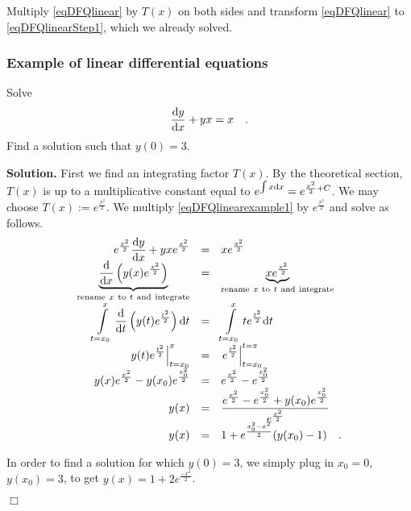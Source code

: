 \documentclass[12pt]{book}
\newenvironment{solution}{\medskip\noindent\textbf{Solution.} }{$\Box$}
\renewcommand{\optionalDisplay}[1]{}
\begin{document}
Multiply \eqref{eqDFQlinear} by $T(x)$ on both sides and transform \eqref{eqDFQlinear} to \eqref{eqDFQlinearStep1}, which we already solved.
\subsubsection{Example of linear differential equations}
Solve
\begin{equation}\label{eqDFQlinearexample1}
\frac{{\normalfont \text{d}} y}{{\normalfont \text{d}} x}+ y x=x\quad .
\end{equation} Find a solution such that $y(0)=3$.

\begin{solution}
First we find an integrating factor $T(x)$. By the theoretical section, $T(x)$ is up to a multiplicative constant equal to $e^{\int x {\normalfont \text{d}} x}= e^{\frac{x^2}2 +C}$. We may choose $T(x):= e^{\frac{x^2}2}$. We multiply \eqref{eqDFQlinearexample1} by $e^{\frac{x^2}2}$ and solve as follows.
\[
\begin{array}{rcl}
\displaystyle e^{\frac{x^2}2}\frac{{\normalfont \text{d}} y}{{\normalfont \text{d}} x}+ yxe^{\frac{x^2}2}&=&\displaystyle xe^{\frac{x^2}2}\\
\underbrace{\frac{{\normalfont \text{d}}}{{\normalfont \text{d}} x} \left(y(x) e^{\frac{x^2}2} \right)}_{\mathrm{rename~}x~\mathrm{to~}t\mathrm{~and~integrate}}&=&\underbrace{xe^{\frac{x^2}2}}_{\mathrm{rename~}x\mathrm{~to~}t\mathrm{~and~integrate}}\\
\displaystyle\int\limits_{t=x_0}^x \frac{{\normalfont \text{d}}}{{\normalfont \text{d}} t} \left(y(t) e^{\frac{t^2}2}\right) {\normalfont \text{d}} t &=&\displaystyle \int\limits_{t=x_0}^x  te^{\frac{t^2}2}{\normalfont \text{d}} t\\
\displaystyle\left.y(t) e^{\frac{t^2}2}\right|_{t=x_0}^x&=&\displaystyle \left.e^{\frac{t^2}2}\right|_{t=x_0}^{t=x}\\
\displaystyle y(x)e^{\frac{x^2}2}- y(x_0)e^{\frac{x_0^2}2}&=&\displaystyle e^{\frac{x^2}2}- e^{\frac{x_0^2}2}\\
y(x)&=&\displaystyle \frac{e^{\frac{x^2}2}- e^{\frac{x_0^2}2}+ y(x_0)e^{\frac{x_0^2}2}}{e^{\frac{x^2}2}}\\
y(x)&=&\displaystyle 1+{e^{\frac{x_0^2-x^2}2}}(y(x_0)-1)\quad.
\end{array}
\]

In order to find a solution for which $y(0)=3$, we simply plug in $x_0=0$, $y(x_0)=3$, to get $y(x)=1+2e^{\frac{-x^2}2}$.

\optionalDisplay{
\begin{pspicture}(-5,-5)(5,5)
\psaxes{<->}(0,0)(-5,-5)(5,5)
\newcommand{\Xstart}{1}
\newcommand{\Ystart}{1}
\psplot[linecolor=green]{-4}{4}{ 2.718281828 \Xstart\space \Xstart\space mul x x mul sub exp \Ystart\space 1 sub mul 1 add}
\renewcommand{\Xstart}{0}
\renewcommand{\Ystart}{-1}
\psplot[linecolor=green]{-4}{4}{ 2.718281828 \Xstart\space \Xstart\space mul x x mul sub exp \Ystart\space 1 sub mul 1 add}
\renewcommand{\Xstart}{0}
\renewcommand{\Ystart}{3}
\psplot[linecolor=green]{-4}{4}{ 2.718281828 \Xstart\space \Xstart\space mul x x mul sub exp \Ystart\space 1 sub mul 1 add}


\end{pspicture}}
\end{solution}
\end{document}
